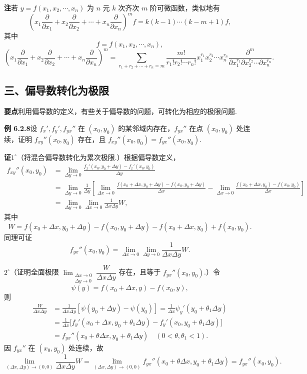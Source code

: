 \documentclass[UTF8, 12pt, fontset=fandol, oneside]{ctexart}
\begin{document}
\noindent\textbf{注}\quad 若 $y=f(x_1,x_2,\cdots,x_n)$ 为 $n$ 元 $k$ 次齐次 $m$ 阶可微函数，类似地有
\[
  \left(x_1\frac{\partial}{\partial x_1}+x_2\frac{\partial}{\partial x_2}+\cdots+x_n\frac{\partial}{\partial x_n}\right)^m f
  =k(k-1)\cdots(k-m+1)f,
\]
其中
\[
  f=f(x_1,x_2,\cdots,x_n),
\]
\[
  \left(x_1\frac{\partial}{\partial x_1}+x_2\frac{\partial}{\partial x_2}+\cdots+x_n\frac{\partial}{\partial x_n}\right)^m
  =
  \sum_{r_1+r_2+\cdots+r_n=m}\frac{m!}{r_1!r_2!\cdots r_n!}
  x_1^{r_1}x_2^{r_2}\cdots x_n^{r_n}
  \frac{\partial^m}{\partial x_1^{r_1}\partial x_2^{r_2}\cdots\partial x_n^{r_n}}.
\]

\subsection*{三、偏导数转化为极限}

\noindent\textbf{要点}\quad 利用偏导数的定义，有些关于偏导数的问题，可转化为相应的极限问题.

\noindent\textbf{例 6.2.8}\quad 设 $f_x',f_y',f_{yx}''$ 在 $(x_0,y_0)$ 的某邻域内存在，$f_{yx}''$ 在点 $(x_0,y_0)$ 处连续，证明 $f_{xy}''(x_0,y_0)$ 存在，且 $f_{xy}''(x_0,y_0)=f_{yx}''(x_0,y_0)$.

\noindent\textbf{证}\quad $1^\circ$（将混合偏导数转化为累次极限.）根据偏导数定义，
\[
\begin{aligned}
f_{xy}''(x_0,y_0)
&=\lim_{\Delta y\to0}\frac{f_x'(x_0,y_0+\Delta y)-f_x'(x_0,y_0)}{\Delta y}\\
&=\lim_{\Delta y\to0}\frac1{\Delta y}\left[
\lim_{\Delta x\to0}\frac{f(x_0+\Delta x,y_0+\Delta y)-f(x_0,y_0+\Delta y)}{\Delta x}
-\lim_{\Delta x\to0}\frac{f(x_0+\Delta x,y_0)-f(x_0,y_0)}{\Delta x}\right]\\
&=\lim_{\Delta y\to0}\lim_{\Delta x\to0}\frac1{\Delta x\Delta y}W,
\end{aligned}
\]
其中
\[
  W=f(x_0+\Delta x,y_0+\Delta y)-f(x_0,y_0+\Delta y)-f(x_0+\Delta x,y_0)+f(x_0,y_0).
\]
同理可证
\[
  f_{yx}''(x_0,y_0)=\lim_{\Delta x\to0}\lim_{\Delta y\to0}\frac1{\Delta x\Delta y}W.
\]

$2^\circ$（证明全面极限 $\displaystyle\lim_{\substack{\Delta x\to0\\ \Delta y\to0}}\dfrac{W}{\Delta x\Delta y}$ 存在，且等于 $f_{yx}''(x_0,y_0)$.）令
\[
  \psi(y)=f(x_0+\Delta x,y)-f(x_0,y),
\]
则
\[
\begin{aligned}
\frac{W}{\Delta x\Delta y}
&=\frac1{\Delta x\Delta y}[\psi(y_0+\Delta y)-\psi(y_0)]
=\frac1{\Delta x}\psi_y'(y_0+\theta_1\Delta y)\\
&=\frac1{\Delta x}\bigl[f_y'(x_0+\Delta x,y_0+\theta_1\Delta y)-f_y'(x_0,y_0+\theta_1\Delta y)\bigr]\\
&=f_{yx}''(x_0+\theta\Delta x,y_0+\theta_1\Delta y)\quad(0<\theta,\theta_1<1).
\end{aligned}
\]
因 $f_{yx}''$ 在 $(x_0,y_0)$ 处连续，故
\[
  \lim_{(\Delta x,\Delta y)\to(0,0)}\frac1{\Delta x\Delta y}W
  =\lim_{(\Delta x,\Delta y)\to(0,0)}f_{yx}''(x_0+\theta\Delta x,y_0+\theta_1\Delta y)
  =f_{yx}''(x_0,y_0).
\]
\end{document}
